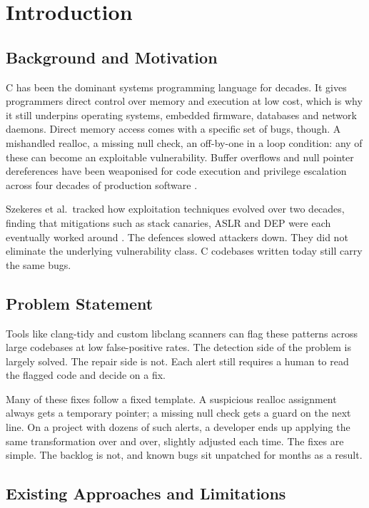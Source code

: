 \chapter{Introduction}
\label{chap:introduction}

\section{Background and Motivation}

C has been the dominant systems programming language for decades. It gives programmers direct control over memory and execution at low cost, which is why it still underpins operating systems, embedded firmware, databases and network daemons. Direct memory access comes with a specific set of bugs, though. A mishandled realloc, a missing null check, an off-by-one in a loop condition: any of these can become an exploitable vulnerability. Buffer overflows and null pointer dereferences have been weaponised for code execution and privilege escalation across four decades of production software \cite{b9}.

Szekeres et al.\ tracked how exploitation techniques evolved over two decades, finding that mitigations such as stack canaries, ASLR and DEP were each eventually worked around \cite{b9}. The defences slowed attackers down. They did not eliminate the underlying vulnerability class. C codebases written today still carry the same bugs.

\section{Problem Statement}

Tools like clang-tidy and custom libclang scanners can flag these patterns across large codebases at low false-positive rates. The detection side of the problem is largely solved. The repair side is not. Each alert still requires a human to read the flagged code and decide on a fix.

Many of these fixes follow a fixed template. A suspicious realloc assignment always gets a temporary pointer; a missing null check gets a guard on the next line. On a project with dozens of such alerts, a developer ends up applying the same transformation over and over, slightly adjusted each time. The fixes are simple. The backlog is not, and known bugs sit unpatched for months as a result.

\section{Existing Approaches and Limitations}

